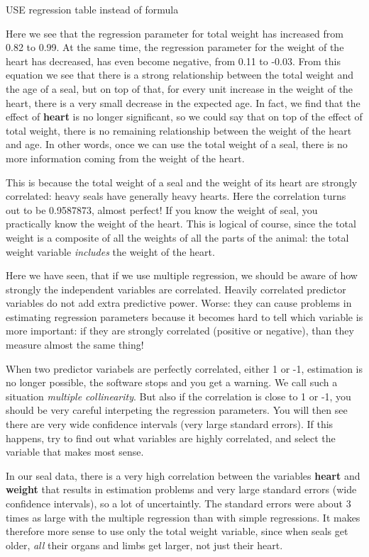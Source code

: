 \documentclass[]{report}\usepackage[]{graphicx}\usepackage[]{color}
\begin{document}
USE regression table instead of formula


Here we see that the regression parameter for total weight has increased from 0.82 to 0.99. At the same time, the regression parameter for the weight of the heart has decreased, has even become negative, from 0.11 to -0.03. From this equation we see that there is a strong relationship between the total weight and the age of a seal, but on top of that, for every unit increase in the weight of the heart, there is a very small decrease in the expected age. In fact, we find that the effect of \textbf{heart} is no longer significant, so we could say that on top of the effect of total weight, there is no remaining relationship between the weight of the heart and age. In other words, once we can use the total weight of a seal, there is no more information coming from the weight of the heart.

This is because the total weight of a seal and the weight of its heart are strongly correlated: heavy seals have generally heavy hearts. Here the correlation turns out to be 0.9587873, almost perfect! If you know the weight of seal, you practically know the weight of the heart. This is logical of course, since the total weight is a composite of all the weights of all the parts of the animal: the total weight variable \textit{includes} the weight of the heart.

Here we have seen, that if we use multiple regression, we should be aware of how strongly the independent variables are correlated. Heavily correlated predictor variables do not add extra predictive power. Worse: they can cause problems in estimating regression parameters because it becomes hard to tell which variable is more important: if they are strongly correlated (positive or negative), than they measure almost the same thing!

When two predictor variabels are perfectly correlated, either 1 or -1, estimation is no longer possible, the software stops and you get a warning. We call such a situation \textit{multiple collinearity}. But also if the correlation is close to 1 or -1, you should be very careful interpeting the regression parameters. You will then see there are very wide confidence intervals (very large standard errors). If this happens, try to find out what variables are highly correlated, and select the variable that makes most sense.

In our seal data, there is a very high correlation between the variables \textbf{heart} and \textbf{weight} that results in estimation problems and very large standard errors (wide confidence intervals), so a lot of uncertaintly. The standard errors were about 3 times as large with the multiple regression than with simple regressions. It makes therefore more sense to use only the total weight variable, since when seals get older, \textit{all} their organs and limbs get larger, not just their heart.
\end{document}
